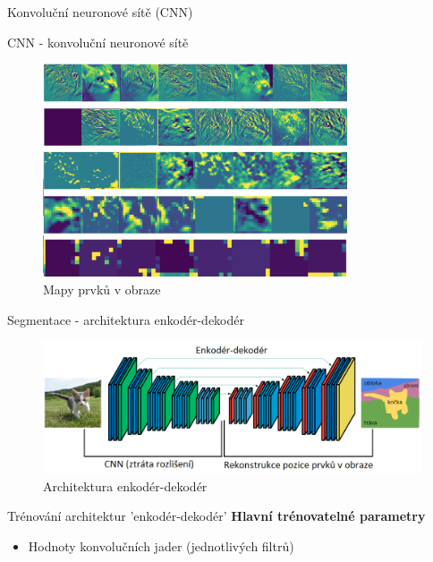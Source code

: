 \documentclass[aspectratio=1610]{beamer}
\begin{document}
\begin{frame}{}
\centering
{\Large Konvoluční neuronové sítě (CNN)}	
\end{frame}
\begin{frame}{CNN - konvoluční neuronové sítě}
	\begin{figure}[h]
	\begin{center}
		\includegraphics[width=9cm, keepaspectratio]{maps.png}
	\end{center}
	\caption{Mapy prvků v obraze} 	
\end{figure}
\end{frame}
\begin{frame}{Segmentace - architektura enkodér-dekodér}
\begin{figure}[h]
	\begin{center}
		\includegraphics[width=15cm, keepaspectratio]{segnet.png}
	\end{center}
	\caption{Architektura enkodér-dekodér} 	
\end{figure}
\end{frame}
\begin{frame}{Trénování architektur 'enkodér-dekodér'}
\textbf{Hlavní trénovatelné parametry}

\begin{itemize}
	\item Hodnoty konvolučních jader (jednotlivých filtrů)
	\vspace{5mm}		
	\begin{center}		
	\end{center}	
\end{itemize}

\end{frame}
\end{document}
